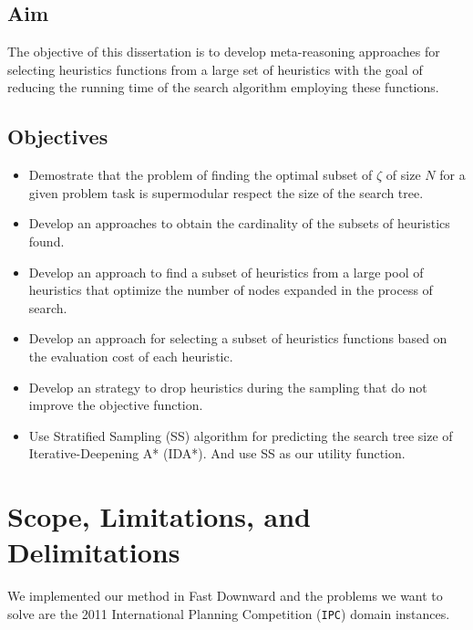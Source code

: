 \subsection{Aim}
\noindent
The objective of this dissertation is to develop meta-reasoning approaches for selecting heuristics functions from a large set of heuristics with the goal of reducing the running time of the search algorithm employing these functions.

\subsection{Objectives}
\noindent

\begin{itemize}
  \item Demostrate that the problem of finding the optimal subset of $\zeta$ of size $N$ for a given problem task is supermodular respect the size of the search tree.

  \item Develop an approaches to obtain the cardinality of the subsets of heuristics found.
  
  \item Develop an approach to find a subset of heuristics from a large pool of heuristics that optimize the number of nodes expanded in the process of search.
  
  \item Develop an approach for selecting a subset of heuristics functions based on the evaluation cost of each heuristic.
  
  \item Develop an strategy to drop heuristics during the sampling that do not improve the objective function.  
  
  \item Use Stratified Sampling (SS) algorithm for predicting the search tree size of Iterative-Deepening A* (IDA*). And use SS as our utility function.
   
\end{itemize}
\section{Scope, Limitations, and Delimitations}
\noindent
We implemented our method in Fast Downward \cite{helmert2006fast} and the problems we want to solve are the 2011 International Planning Competition (\texttt{IPC}) domain instances.\\

